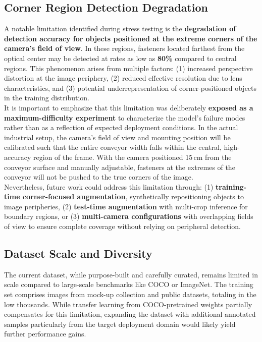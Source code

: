 \subsection{Corner Region Detection Degradation}

A notable limitation identified during stress testing is the \textbf{degradation of detection accuracy for objects positioned at the extreme corners of the camera's field of view}. In these regions, fasteners located farthest from the optical center may be detected at rates as low as \textbf{80\%} compared to central regions. This phenomenon arises from multiple factors: (1) increased perspective distortion at the image periphery, (2) reduced effective resolution due to lens characteristics, and (3) potential underrepresentation of corner-positioned objects in the training distribution.\\

It is important to emphasize that this limitation was deliberately \textbf{exposed as a maximum-difficulty experiment} to characterize the model's failure modes rather than as a reflection of expected deployment conditions. In the actual industrial setup, the camera's field of view and mounting position will be calibrated such that the entire conveyor width falls within the central, high-accuracy region of the frame. With the camera positioned 15\,cm from the conveyor surface and manually adjustable, fasteners at the extremes of the conveyor will not be pushed to the true corners of the image.\\

Nevertheless, future work could address this limitation through: (1) \textbf{training-time corner-focused augmentation}, synthetically repositioning objects to image peripheries, (2) \textbf{test-time augmentation} with multi-crop inference for boundary regions, or (3) \textbf{multi-camera configurations} with overlapping fields of view to ensure complete coverage without relying on peripheral detection.

\subsection{Dataset Scale and Diversity}

The current dataset, while purpose-built and carefully curated, remains limited in scale compared to large-scale benchmarks like COCO or ImageNet. The training set comprises images from mock-up collection and public datasets, totaling in the low thousands. While transfer learning from COCO-pretrained weights partially compensates for this limitation, expanding the dataset with additional annotated samples particularly from the target deployment domain would likely yield further performance gains.

